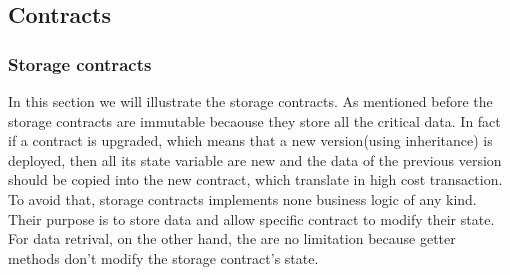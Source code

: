 \subsection{Contracts}
\subsubsection{Storage contracts}
In this section we will illustrate the storage contracts. As mentioned before the storage contracts are immutable becaouse they store all the critical data. In fact if a contract is upgraded, which means that a new version(using inheritance) is deployed, then all its state variable are new and the data of the previous version should be copied into the new contract, which translate in high cost transaction.\\
To avoid that, storage contracts implements none business logic of any kind. Their purpose is to store data and allow specific contract to modify their state. For data retrival, on the other hand, the are no limitation because getter methods don't modify the storage contract's state.
